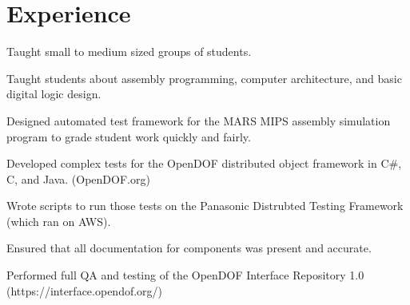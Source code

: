 \documentclass[letterpaper]{deedy-resume} %
\begin{document}
\begin{minipage}[t]{0.64\textwidth} %


\section{Experience}

\vspace{\topsep} %
\begin{tightitemize}
\item Taught small to medium sized groups of students.
\item Taught students about assembly programming, computer architecture, and basic digital logic design.
\item Designed automated test framework for the MARS MIPS assembly simulation program to grade student work quickly and fairly.
\end{tightitemize}


\vspace{\topsep} %
\begin{tightitemize}
\item Developed complex tests for the OpenDOF distributed object framework in C\#, C, and Java. (OpenDOF.org)
\item Wrote scripts to run those tests on the Panasonic Distrubted Testing Framework (which ran on AWS).
\item Ensured that all documentation for components was present and accurate.
\item Performed full QA and testing of the OpenDOF Interface Repository 1.0 (https://interface.opendof.org/)
\end{tightitemize}

\sectionspace




\end{minipage}
\end{document}
